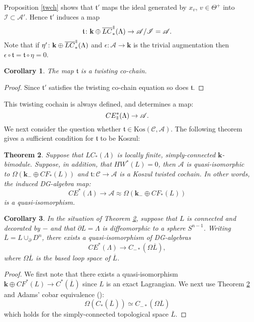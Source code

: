 \documentclass{gtpart}
\newtheorem{thm}{Theorem}
\newtheorem{cor}[thm]{Corollary}
\renewcommand{\k}{\mathbf{k}}
\renewcommand{\t}{\mathfrak{t}}
\newcommand{\A}{\mathscr{A}}
\renewcommand{\C}{\mathscr{C}}
\renewcommand{\parallel}{{\mkern3mu\vphantom{\perp}\vrule depth 0pt\mkern2mu\vrule depth
0pt\mkern3mu}}
\begin{document}
Proposition \ref{twch} shows that $\t'$ maps the ideal generated by $x_{v}$, $v\in\Theta^{+}$ into $\mathscr{I}\subset\A'$. Hence $\t'$ induces a map
\[ 
\t\colon \k\oplus \overline{LC}_{\ast}^{\parallel}(\Lambda)\to \A/\mathscr{I}=\A.
\]
Note that if $\eta'\colon \k\oplus \overline{LC}_{\ast}^{\parallel}(\Lambda)$ and $\epsilon\colon\A\to\k$ is the trivial augmentation then $\epsilon\circ\t=\t\circ\eta=0$.
\begin{cor}
The map $\t$ is a twisting co-chain.
\end{cor}

\begin{proof}
Since $\t'$ satisfies the twisting co-chain equation so does $\t$. 	
\end{proof}

This twisting cochain is always defined, and determines a map:
\begin{equation} \label{ingen} 
CE^*_{\parallel}(\Lambda) \to \A. 
\end{equation}
We next consider the question whether $\t \in \mathrm{Kos}(\C, \A)$.
The following theorem gives a sufficient condition for $\t$ to be Koszul: 

\begin{thm} \label{mainthm} Suppose that $LC_*(\Lambda)$ is locally finite, simply-connected $\k$-bimodule.
    Suppose, in addition, that $HW^*(L)=0$, then $\A$ is quasi-isomorphic to $\Omega(\k_{-}
    \oplus CF_*(L))$ and $\t \colon \C \to \A$ is a
    Koszul twisted cochain. In
    other words, the induced DG-algebra map:
    \[ CE^*(\Lambda) \to \A\approx \Omega (\k_{-} \oplus CF_*(L)) \]
is a quasi-isomorphism.
\end{thm}

\begin{cor}\label{cor:CE=loopspace} 
	In the situation of Theorem \ref{mainthm}, suppose that $L$ is connected and decorated by $-$ and that
    $\partial L = \Lambda$ is diffeomorphic to a sphere $S^{n-1}$. Writing $\overline{L} = L \cup_{\partial} D^n$, there exists a quasi-isomorphism of DG-algebras
    \[ CE^*(\Lambda) \to C_{-*}(\Omega \overline{L}), \] 
where $\Omega \overline{L}$ is the based loop space of $\overline{L}$. 
\end{cor} 
\begin{proof} We first note that there exists a quasi-isomorphism $\k \oplus CF^*(L) \to
    C^*(\overline{L})$ since $L$ is an exact Lagrangian. We next use Theorem \ref{mainthm}
    and Adams' cobar equivalence (\cite{adams}): \[ \Omega (C_*(\overline{L})) \simeq C_{-*}(\Omega
    {\overline{L}}) \]
    which holds for the simply-connected topological space $\overline{L}$.     
\end{proof}
\end{document}
